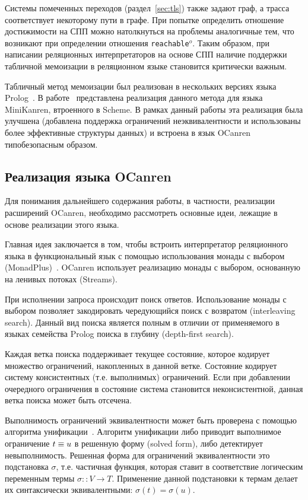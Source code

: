 Системы помеченных переходов (раздел~\ref{sec:tls}) 
также задают граф, а трасса соответствует некоторому пути в графе.
При попытке определить отношение достижимости на СПП 
можно натолкнуться на проблемы аналогичные тем, 
что возникают при определении отношения \texttt{reachable$^o$}.
Таким образом, при написании реляционных интерпретаторов на 
основе СПП наличие поддержки табличной мемоизации 
в реляционном языке становится критически важным.

Табличный метод мемоизации был реализован 
в нескольких версиях языка Prolog~\cite{swift2012xsb, wielemaker2012swi}.
В работе~\cite{byrd2009relational} представлена реализация данного метода 
для языка MiniKanren, втроенного в Scheme.
В рамках данный работы эта реализация была улучшена 
(добавлена поддержка ограничений неэквивалентности и 
использованы более эффективные структуры данных)
и встроена в язык OCanren типобезопасным образом.

\subsection{Реализация языка OCanren}

\label{sec:ocanren-impl}

Для понимания дальнейшего содержания работы,
в частности, реализации расширений OCanren,
необходимо рассмотреть основные идеи, 
лежащие в основе реализации этого языка.

Главная идея заключается в том, чтобы 
встроить интерпретатор реляционного языка в функциональный язык 
с помощью использования монады с выбором (MonadPlus)~\cite{kiselyov2005backtracking, kosarev2016typed}.
OCanren использует реализацию монады с выбором, основанную на ленивых потоках (Streams).

При исполнении запроса происходит поиск ответов.
Использование монады с выбором позволяет закодировать 
чередующийся поиск с возвратом (interleaving search).
Данный вид поиска является полным в отличии от 
применяемого в языках семейства Prolog поиска в глубину (depth-first search).

Каждая ветка поиска поддерживает текущее состояние,
которое кодирует множество ограничений, накопленных в данной ветке.
Состояние кодирует систему консистентных (т.е. выполнимых) ограничений.
Если при добавлении очередного ограничения в состояние
система становится неконсистентной, 
данная ветка поиска может быть отсечена.

Выполнимость ограничений эквивалентности может быть проверена 
с помощью алгоритма унификации~\cite{baader2001unification}.
Алгоритм унификации либо приводит выполнимое ограничение $t \equiv u$ 
в решенную форму (solved form),
либо детектирует невыполнимость.
Решенная форма для ограничений эквивалентности 
это подстановка $\sigma$, т.е. частичная функция, которая ставит в соответствие 
логическим переменным термы $\sigma :: V \rightarrow T$.
Применение данной подстановки к термам делает их синтаксически эквивалентными:
$\sigma(t) = \sigma(u)$.

